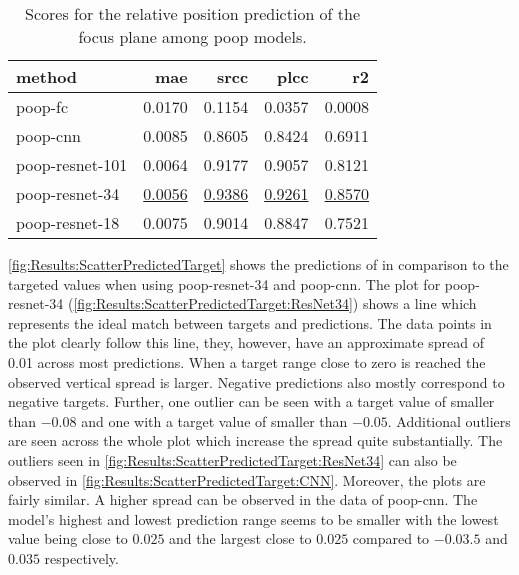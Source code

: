 \begin{table}
    \centering
    \caption[Relative position prediction scores]{Scores for the relative position prediction of the focus plane among \acs{poop} models.}
    \begin{tabular}{lrrrr}
        \hline
        method          & \acs{mae} & \acs{srcc} & \acs{plcc} & \acs{r2} \\
        \hline
        \acs{poop}-\acs{fc}             & 0.0170 & 0.1154 & 0.0357 & 0.0008 \\
        \acs{poop}-\acs{cnn}            & 0.0085 & 0.8605 & 0.8424 & 0.6911 \\
        \acs{poop}-\acs{resnet}-101     & 0.0064 & 0.9177 & 0.9057 & 0.8121 \\
        \acs{poop}-\acs{resnet}-34      & \underline{0.0056} & \underline{0.9386} & \underline{0.9261} & \underline{0.8570} \\
        \acs{poop}-\acs{resnet}-18      & 0.0075 & 0.9014 & 0.8847 & 0.7521 \\
    \end{tabular}
    \label{tab:Results:Models:Accuracy}
\end{table}

\autoref{fig:Results:ScatterPredictedTarget} shows the predictions of in comparison to the targeted values when using \acs{poop}-\acs{resnet}-34 and \acs{poop}-\acs{cnn}. The plot for \acs{poop}-\acs{resnet}-34 (\autoref{fig:Results:ScatterPredictedTarget:ResNet34}) shows a line which represents the ideal match between targets and predictions. The data points in the plot clearly follow this line, they, however, have an approximate spread of 0.01 across most predictions. When a target range close to zero is reached the observed vertical spread is larger. Negative predictions also mostly correspond to negative targets. Further, one outlier can be seen with a target value of smaller than $-0.08$ and one with a target value of smaller than $-0.05$. Additional outliers are seen across the whole plot which increase the spread quite substantially. The outliers seen in \autoref{fig:Results:ScatterPredictedTarget:ResNet34} can also be observed in \autoref{fig:Results:ScatterPredictedTarget:CNN}. Moreover, the plots are fairly similar. A higher spread can be observed in the data of \acs{poop}-\acs{cnn}. The model's highest and lowest prediction range seems to be smaller with the lowest value being close to $0.025$ and the largest close to $0.025$ compared to $-0.03.5$ and $0.035$ respectively.


